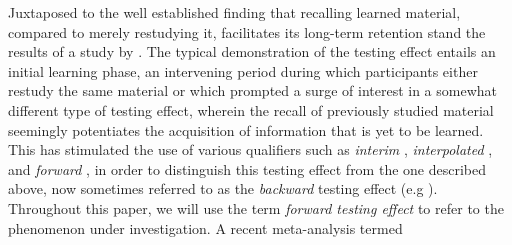 \documentclass[../main.tex]{subfiles}
\begin{document}
Juxtaposed to the well established finding that recalling learned material, compared to merely restudying it, facilitates its long-term retention \citep{roedigeriiiPowerTestingMemory2006, roedigeriiiTestEnhancedLearningTaking2006, rowlandEffectTestingRestudy2014, adesopeRethinkingUseTests2017, roedigeriiiCriticalRoleRetrieval2011} stand the results of a study by \cite{szpunarTestingStudyInsulates2008}. The typical demonstration of the testing effect entails an initial learning phase, an intervening period during which participants either restudy the same material or   which prompted a surge of interest in a somewhat different type of testing effect, wherein the recall of previously studied material seemingly potentiates the acquisition of information that is yet to be learned. This has stimulated the use of various qualifiers such as \textit{interim} \citep{wissmanInterimTestEffect2011}, \textit{interpolated} \citep{szpunarInterpolatedMemoryTests2013}, and \textit{forward} \citep{pastotterRetrievalPracticeEnhances2014,yangEnhancingLearningRetrieval2018}, in order to distinguish this testing effect from the one described above, now sometimes referred to as the \textit{backward} testing effect (e.g \citealp{yangEnhancingLearningRetrieval2018}). Throughout this paper, we will use the term \textit{forward testing effect} to refer to the phenomenon under investigation. A recent meta-analysis termed 

{
    \biblio
}
\end{document}
